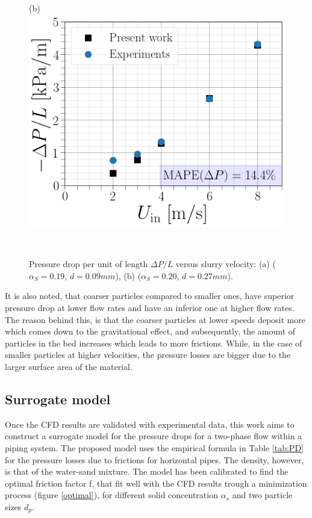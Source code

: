 \documentclass[review,3p,times,12pt]{elsarticle}
\begin{document}
\begin{minipage}[t]{0.5\textwidth}
\begin{figure}[H]
\begin{center}
(b)\includegraphics[scale = 0.3]{figs/DP27}
\end{center}
\end{figure}
\end{minipage}\\
\begin{figure}[H]
\centering
\caption{Pressure drop per unit of length $\Delta P/L$  versus slurry velocity: (a) ($\alpha_S=0.19$, $d=0.09 mm$), (b) ($\alpha_S=0.20$, $d=0.27 mm$).}
\label{P}
\end{figure}

It is also noted, that coarser particles compared to smaller ones, have superior pressure drop at lower flow rates and have an inferior one at higher flow rates.  The reason behind this, is that the coarser particles at lower speeds deposit more which comes down to the gravitational effect, and subsequently, the amount of particles in the bed increases which leads to more frictions. While, in the case of smaller particles at higher velocities, the  pressure losses are bigger due to the larger surface area of the material.
\subsection{Surrogate model}
Once the CFD results are validated with experimental data, this work aims to construct a surrogate model for the pressure drops for a two-phase flow within a piping system. The proposed model uses the empirical formula in Table \ref{tab:PD} for the pressure losses due to frictions for horizontal pipes. The density, however, is that of the water-sand mixture. The model has been calibrated to find the optimal friction factor f, that fit well with the CFD results trough a minimization process (figure \ref{optimal}), for different solid concentration $\alpha_s$ and two particle sizes $d_p$. %
\end{document}
